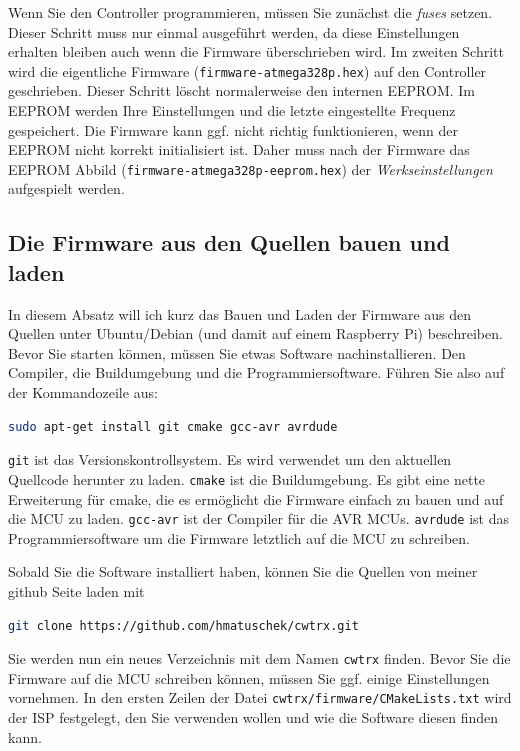 \documentclass[10pt, a4paper,twoside]{scrartcl}
\begin{document}
Wenn Sie den Controller programmieren, müssen Sie zunächst die \emph{fuses} setzen. Dieser Schritt muss nur einmal ausgeführt werden, da diese Einstellungen erhalten bleiben auch wenn die Firmware überschrieben wird. Im zweiten Schritt wird die eigentliche Firmware (\texttt{firmware-atmega328p.hex}) auf den Controller geschrieben. Dieser Schritt löscht normalerweise den internen EEPROM. Im EEPROM werden Ihre Einstellungen und die letzte eingestellte Frequenz gespeichert. Die Firmware kann ggf. nicht richtig funktionieren, wenn der EEPROM nicht korrekt initialisiert ist. Daher muss nach der Firmware das EEPROM Abbild (\texttt{firmware-atmega328p-eeprom.hex}) der \emph{Werkseinstellungen} aufgespielt werden.

\subsection{Die Firmware aus den Quellen bauen und laden}
In diesem Absatz will ich kurz das Bauen und Laden der Firmware aus den Quellen unter Ubuntu/Debian (und damit auf einem Raspberry Pi) beschreiben. Bevor Sie starten können, müssen Sie etwas Software nachinstallieren. Den Compiler, die Buildumgebung und die Programmiersoftware. Führen Sie also auf der Kommandozeile aus: 
\begin{lstlisting}[language=bash]
sudo apt-get install git cmake gcc-avr avrdude
\end{lstlisting}

\texttt{git} ist das Versionskontrollsystem. Es wird verwendet um den aktuellen Quellcode herunter zu laden. \texttt{cmake} ist die Buildumgebung. Es gibt eine nette Erweiterung für cmake, die es ermöglicht die Firmware einfach zu bauen und auf die MCU zu laden. \texttt{gcc-avr} ist der Compiler für die AVR MCUs. \texttt{avrdude} ist das Programmiersoftware um die Firmware letztlich auf die MCU zu schreiben.

Sobald Sie die Software installiert haben, können Sie die Quellen von meiner github Seite laden mit
\begin{lstlisting}[language=bash]
git clone https://github.com/hmatuschek/cwtrx.git
\end{lstlisting}

Sie werden nun ein neues Verzeichnis mit dem Namen \texttt{cwtrx} finden. Bevor Sie die Firmware auf die MCU schreiben können, müssen Sie ggf. einige Einstellungen vornehmen. In den ersten Zeilen der Datei \texttt{cwtrx/\-firmware/\-CMakeLists.txt} wird der ISP festgelegt, den Sie verwenden wollen und wie die Software diesen finden kann.
\end{document}
